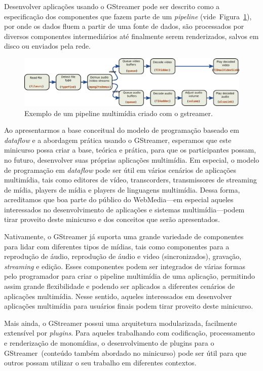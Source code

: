 \documentclass{SBCbookchapter}
\begin{document}
Desenvolver aplicações usando o GStreamer pode ser descrito como a
especificação dos componentes que fazem parte de um \emph{pipeline}
(vide~Figura~\ref{fig:pipeline}), por onde os dados fluem a partir de uma fonte
de dados, são processados por diversos componentes intermediários até
finalmente serem renderizados, salvos em disco ou enviados pela rede.

\begin{figure}[ht!]
  \label{fig:pipeline}
  \includegraphics[width=\textwidth]{gstreamer_pipeline.pdf}
  \caption{Exemplo de um pipeline multimídia criado com o gstreamer.}
\end{figure}

Ao apresentarmos a base conceitual do modelo de programação baseado em
\emph{dataflow} e a abordagem prática usando o GStreamer, esperamos que este
minicurso possa criar a base, teórica e prática, para que os participantes
possam, no futuro, desenvolver suas próprias aplicações multimídia.  Em
especial, o modelo de programação em \emph{dataflow} pode ser útil em vários
cenários de aplicações multimídia, tais como editores de vídeo, transcorders,
transmissores de streaming de mídia, players de mídia e players de linguagens
multimídia.  Dessa forma, acreditamos que boa parte do público do WebMedia---em
especial aqueles interessados no desenvolvimento de aplicações e sistemas
multimídia---podem tirar proveito deste minicurso e dos conceitos que serão
apresentados.

Nativamente, o GStreamer já suporta uma grande variedade de componentes para
lidar com diferentes tipos de mídias, tais como componentes para a reprodução
de áudio, reprodução de áudio e video (sincronizados), gravação,
\emph{streaming} e edição.  Esses componentes podem ser integrados de várias
formas pelo programador para criar o pipeline multimídia de uma aplicação,
permitindo assim grande flexibilidade e podendo ser aplicados a diferentes
cenários de aplicações multimídia. Nesse sentido, aqueles interessados em
desenvolver aplicações multimídia para usuários finais podem tirar proveito
deste minicurso. 

Mais ainda, o GStreamer possui uma arquitetura modularizada, facilmente
extensível por \emph{plugins}. Para aqueles trabalhando com codificação,
processamento e renderização de monomídias, o desenvolvimento de plugins para
o GStreamer~(conteúdo também abordado no minicurso) pode ser útil para que
outros possam utilizar o seu trabalho em diferentes contextos.
\end{document}

